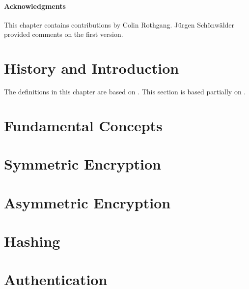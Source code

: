 \paragraph{Acknowledgments}
This chapter contains contributions by Colin Rothgang.
J\"urgen Sch\"onw\"alder provided comments on the first version.

\section{History and Introduction}\label{sec:sd:crypto:hist}
The definitions in this chapter are based on \cite{PuMaC2016}. 
This section is based partially on \cite{cryptoNetworkSlides}. 


\section{Fundamental Concepts}


\section{Symmetric Encryption}\label{sec:sd:crypto:sym}


\section{Asymmetric Encryption}\label{sec:sd:crypto:asym}


\section{Hashing}\label{sec:sd:crypto:hash}


\section{Authentication}\label{sec:sd:crypto:auth}


